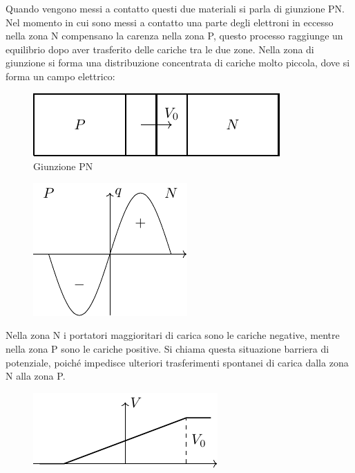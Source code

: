 \documentclass{article}
\numberwithin{equation}{subsection}
\begin{document}
Quando vengono messi a contatto questi due materiali si parla di giunzione PN. Nel momento in cui sono messi a contatto una parte degli elettroni in eccesso nella zona N 
compensano la carenza nella zona P, questo processo raggiunge un equilibrio dopo aver trasferito delle cariche tra le due zone. Nella zona di giunzione 
si forma una distribuzione concentrata di cariche molto piccola, dove si forma un campo elettrico:
\begin{figure}[H]%
    \centering
    \includegraphics{giunzione-pn.pdf}%
    \caption{Giunzione PN}
    \label{fig:giunzione-pn}
\end{figure}
\begin{figure}[H]%
    \centering
    \includegraphics{carica-giunzione-pn.pdf}%
    \label{fig:carica-giunzione-pn}    
\end{figure}
Nella zona N i portatori maggioritari di carica sono le cariche negative, mentre nella zona P sono le cariche positive. 
Si chiama questa situazione barriera di potenziale, poiché impedisce ulteriori trasferimenti spontanei di carica dalla zona N alla zona P.
\begin{figure}[H]%
    \centering
    \includegraphics{barriera-potenziale.pdf}%
    \label{fig:barriera-potenziale}
\end{figure}
\end{document}
